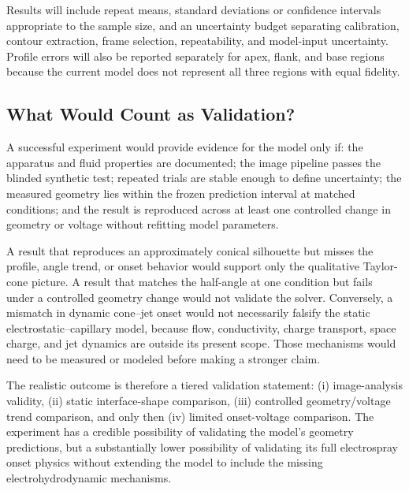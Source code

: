 Results will include repeat means, standard deviations or confidence intervals appropriate to the sample size, and an uncertainty budget separating calibration, contour extraction, frame selection, repeatability, and model-input uncertainty. Profile errors will also be reported separately for apex, flank, and base regions because the current model does not represent all three regions with equal fidelity.

\subsection{What Would Count as Validation?}

A successful experiment would provide evidence for the model only if: the apparatus and fluid properties are documented; the image pipeline passes the blinded synthetic test; repeated trials are stable enough to define uncertainty; the measured geometry lies within the frozen prediction interval at matched conditions; and the result is reproduced across at least one controlled change in geometry or voltage without refitting model parameters.

A result that reproduces an approximately conical silhouette but misses the profile, angle trend, or onset behavior would support only the qualitative Taylor-cone picture. A result that matches the half-angle at one condition but fails under a controlled geometry change would not validate the solver. Conversely, a mismatch in dynamic cone--jet onset would not necessarily falsify the static electrostatic--capillary model, because flow, conductivity, charge transport, space charge, and jet dynamics are outside its present scope. Those mechanisms would need to be measured or modeled before making a stronger claim.

The realistic outcome is therefore a tiered validation statement: (i) image-analysis validity, (ii) static interface-shape comparison, (iii) controlled geometry/voltage trend comparison, and only then (iv) limited onset-voltage comparison. The experiment has a credible possibility of validating the model's geometry predictions, but a substantially lower possibility of validating its full electrospray onset physics without extending the model to include the missing electrohydrodynamic mechanisms.
